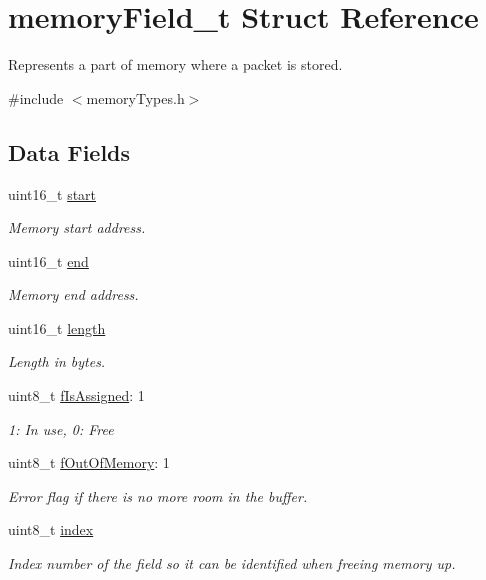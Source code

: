 \hypertarget{structmemory_field__t}{}\section{memory\+Field\+\_\+t Struct Reference}
\label{structmemory_field__t}


Represents a part of memory where a packet is stored.  




{\ttfamily \#include $<$memory\+Types.\+h$>$}

\subsection*{Data Fields}
\begin{DoxyCompactItemize}
\item 
uint16\+\_\+t \mbox{\hyperlink{structmemory_field__t_a171a2b5d11b1a5891c38a98ac731a161}{start}}
\begin{DoxyCompactList}\small\item\em Memory start address. \end{DoxyCompactList}\item 
uint16\+\_\+t \mbox{\hyperlink{structmemory_field__t_afbcd798d035e37e733b567c2b0cb96dc}{end}}
\begin{DoxyCompactList}\small\item\em Memory end address. \end{DoxyCompactList}\item 
uint16\+\_\+t \mbox{\hyperlink{structmemory_field__t_a1892eba2086d12ac2b09005aeb09ea3b}{length}}
\begin{DoxyCompactList}\small\item\em Length in bytes. \end{DoxyCompactList}\item 
uint8\+\_\+t \mbox{\hyperlink{structmemory_field__t_a36ed4d8e7e2e5f308044e7b422a80028}{f\+Is\+Assigned}}\+: 1
\begin{DoxyCompactList}\small\item\em 1\+: In use, 0\+: Free \end{DoxyCompactList}\item 
uint8\+\_\+t \mbox{\hyperlink{structmemory_field__t_a90bc80d5fb22db8fba7b5601b9336395}{f\+Out\+Of\+Memory}}\+: 1
\begin{DoxyCompactList}\small\item\em Error flag if there is no more room in the buffer. \end{DoxyCompactList}\item 
uint8\+\_\+t \mbox{\hyperlink{structmemory_field__t_aae5a12e607d0f782506d9e6ec6179c64}{index}}
\begin{DoxyCompactList}\small\item\em Index number of the field so it can be identified when freeing memory up. \end{DoxyCompactList}\end{DoxyCompactItemize}


